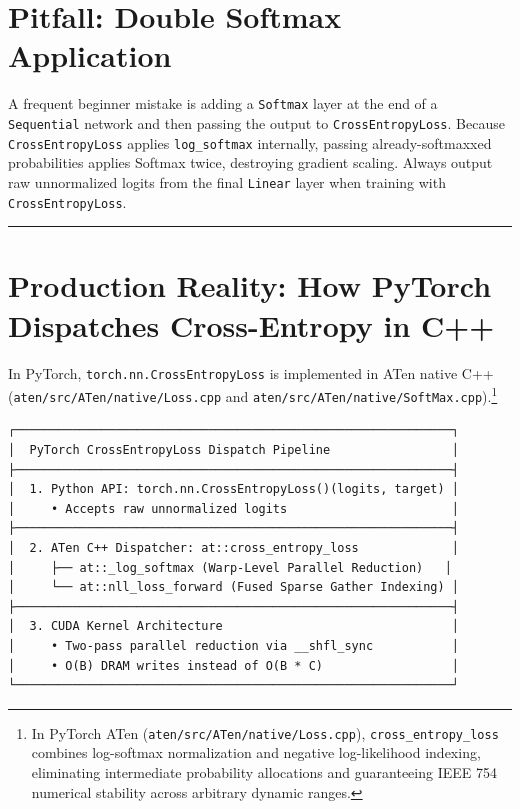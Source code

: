 \documentclass[
  letterpaper,
]{scrbook}
\begin{document}
\section{Pitfall: Double Softmax
Application}\label{pitfall-double-softmax-application}

A frequent beginner mistake is adding a \texttt{Softmax} layer at the
end of a \texttt{Sequential} network and then passing the output to
\texttt{CrossEntropyLoss}. Because \texttt{CrossEntropyLoss} applies
\texttt{log\_softmax} internally, passing already-softmaxxed
probabilities applies Softmax twice, destroying gradient scaling. Always
output raw unnormalized logits from the final \texttt{Linear} layer when
training with \texttt{CrossEntropyLoss}.

\begin{center}\rule{0.5\linewidth}{0.5pt}\end{center}

\section{Production Reality: How PyTorch Dispatches Cross-Entropy in
C++}\label{production-reality-how-pytorch-dispatches-cross-entropy-in-c}

In PyTorch, \texttt{torch.nn.CrossEntropyLoss} is implemented in ATen
native C++ (\texttt{aten/src/ATen/native/Loss.cpp} and
\texttt{aten/src/ATen/native/SoftMax.cpp}).\footnote{In PyTorch ATen
  (\texttt{aten/src/ATen/native/Loss.cpp}),
  \texttt{cross\_entropy\_loss} combines log-softmax normalization and
  negative log-likelihood indexing, eliminating intermediate probability
  allocations and guaranteeing IEEE 754 numerical stability across
  arbitrary dynamic ranges.}

\begin{verbatim}
┌─────────────────────────────────────────────────────────────┐
│  PyTorch CrossEntropyLoss Dispatch Pipeline                 │
├─────────────────────────────────────────────────────────────┤
│  1. Python API: torch.nn.CrossEntropyLoss()(logits, target) │
│     • Accepts raw unnormalized logits                       │
├─────────────────────────────────────────────────────────────┤
│  2. ATen C++ Dispatcher: at::cross_entropy_loss             │
│     ├── at::_log_softmax (Warp-Level Parallel Reduction)   │
│     └── at::nll_loss_forward (Fused Sparse Gather Indexing) │
├─────────────────────────────────────────────────────────────┤
│  3. CUDA Kernel Architecture                                │
│     • Two-pass parallel reduction via __shfl_sync           │
│     • O(B) DRAM writes instead of O(B * C)                  │
└─────────────────────────────────────────────────────────────┘
\end{verbatim}
\end{document}

